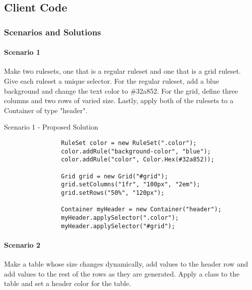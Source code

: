 \documentclass[12pt]{article}
\begin{document}
    \subsection{Client Code}

        \subsubsection{Scenarios and Solutions}

        \paragraph{Scenario 1}
        Make two rulesets, one that is a regular ruleset and one that is a grid ruleset. Give each ruleset a unique selector. For the regular ruleset, add a blue background and change the text color to \#32a852. For the grid, define three columns and two rows of varied size. Lastly, apply both of the rulesets to a Container of type "header".
        
        \begin{shaded}
            Scenario 1 - Proposed Solution
            \begin{lstlisting}
                RuleSet color = new RuleSet(".color");
                color.addRule("background-color", "blue");
                color.addRule("color", Color.Hex(#32a852));

                Grid grid = new Grid("#grid");
                grid.setColumns("1fr", "100px", "2em");
                grid.setRows("50%", "120px");

                Container myHeader = new Container("header");
                myHeader.applySelector(".color");
                myHeader.applySelector("#grid");
            \end{lstlisting}
        \end{shaded}

        \paragraph{Scenario 2}
        Make a table whose size changes dynamically, add values to the header row and add values to the rest of the rows as they are generated. Apply a class to the table and set a header color for the table.
\end{document}

